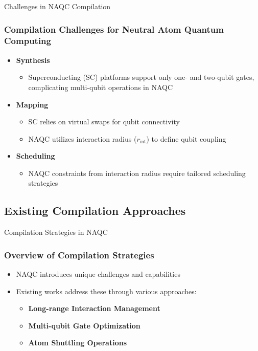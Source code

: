 \begin{frame}{Challenges in NAQC Compilation}
    \frametitle{Compilation Challenges for Neutral Atom Quantum Computing}
    \begin{itemize}
        \item \textbf{Synthesis}
            \begin{itemize}
                \item Superconducting (SC) platforms support only one- and two-qubit gates, complicating multi-qubit operations in NAQC
            \end{itemize}
        \item \textbf{Mapping}
            \begin{itemize}
                \item SC relies on virtual swaps for qubit connectivity
                \item NAQC utilizes interaction radius (\( r_{\text{int}} \)) to define qubit coupling
            \end{itemize}
        \item \textbf{Scheduling}
            \begin{itemize}
                \item NAQC constraints from interaction radius require tailored scheduling strategies
            \end{itemize}
    \end{itemize}
\end{frame}

\subsection{Existing Compilation Approaches}

\begin{frame}{Compilation Strategies in NAQC}
    \frametitle{Overview of Compilation Strategies}
    \begin{itemize}
        \item NAQC introduces unique challenges and capabilities
        \item Existing works address these through various approaches:
            \begin{itemize}
                \item \textbf{Long-range Interaction Management}
                \item \textbf{Multi-qubit Gate Optimization}
                \item \textbf{Atom Shuttling Operations}
            \end{itemize}
    \end{itemize}
\end{frame}

